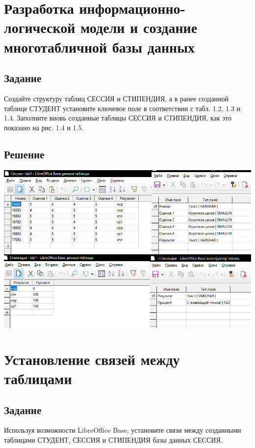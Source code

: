 \documentclass[a4paper, 12pt]{article}
\begin{document}
\section{Разработка информационно-логической модели и 
создание многотабличной базы данных }
\subsection{Задание}
Создайте  структуру  таблиц  СЕССИЯ  и  СТИПЕНДИЯ,  а  в  ранее 
созданной таблице СТУДЕНТ установите ключевое поле в соответствии с 
табл.  1.2,  1.3  и  1.4.  Заполните  вновь  созданные  таблицы  СЕССИЯ  и 
СТИПЕНДИЯ, как это показано на рис. 1.4 и 1.5. 
\subsection{Решение}
\includegraphics[width=\textwidth]{"8-1.png"}\\

\section{Установление связей между таблицами}
\subsection{Задание}
Используя возможности LibreOffice Base, установите связи между 
созданными таблицами СТУДЕНТ, СЕССИЯ и СТИПЕНДИЯ базы данных 
СЕССИЯ.  
\end{document}
